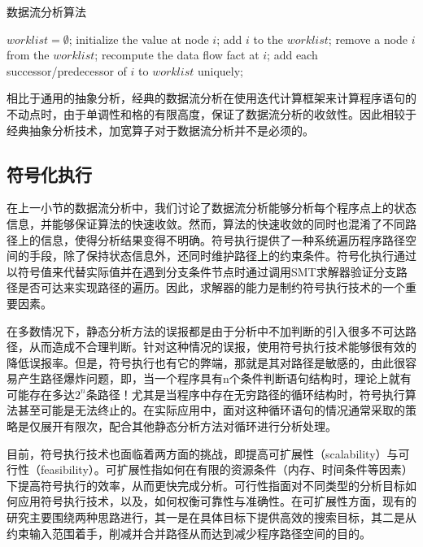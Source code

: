  \begin{algorithm}[H]
 	\caption{数据流分析算法}
 	\label{alg:数据流分析算法}
 	\begin{algorithmic}[1]
 		
 		\State $ worklist = \emptyset $;
 		\State initialize the value at node $ i $;
 		\State add $ i $ to the $ worklist $;
 		\EndFor
 		\State remove a node $ i $ from the $ worklist $;
 		\State recompute the data flow fact at $ i $;
 		\State add each successor/predecessor of $ i $ to $ worklist $ uniquely;
 		\EndIf
 		\EndWhile
 		\EndProcedure
 		
 	\end{algorithmic}
 \end{algorithm}
 
 相比于通用的抽象分析，经典的数据流分析在使用迭代计算框架来计算程序语句的不动点时，由于单调性和格的有限高度，保证了数据流分析的收敛性。因此相较于经典抽象分析技术，加宽算子对于数据流分析并不是必须的。
 
 \subsection{符号化执行}
 
 在上一小节的数据流分析中，我们讨论了数据流分析能够分析每个程序点上的状态信息，并能够保证算法的快速收敛。然而，算法的快速收敛的同时也混淆了不同路径上的信息，使得分析结果变得不明确。符号执行\cite{clarke1976system, king1976symbolic}提供了一种系统遍历程序路径空间的手段，除了保持状态信息外，还同时维护路径上的约束条件。符号化执行通过以符号值来代替实际值并在遇到分支条件节点时通过调用SMT求解器\cite{de2008z3}验证分支路径是否可达来实现路径的遍历。因此，求解器的能力是制约符号执行技术的一个重要因素。
 
 在多数情况下，静态分析方法的误报都是由于分析中不加判断的引入很多不可达路径，从而造成不合理判断。针对这种情况的误报，使用符号执行技术能够很有效的降低误报率。但是，符号执行也有它的弊端，那就是其对路径是敏感的，由此很容易产生路径爆炸问题，即，当一个程序具有n个条件判断语句结构时，理论上就有可能存在多达$ 2^n $条路径！尤其是当程序中存在无穷路径的循环结构时，符号执行算法甚至可能是无法终止的。在实际应用中，面对这种循环语句的情况通常采取的策略是仅展开有限次，配合其他静态分析方法对循环进行分析处理。
 
 目前，符号执行技术也面临着两方面的挑战，即提高可扩展性（scalability）与可行性（feasibility）。可扩展性指如何在有限的资源条件（内存、时间条件等因素）下提高符号执行的效率，从而更快完成分析。可行性指面对不同类型的分析目标如何应用符号执行技术，以及，如何权衡可靠性与准确性。在可扩展性方面，现有的研究主要围绕两种思路进行，其一是在具体目标下提供高效的搜索目标，其二是从约束输入范围着手，削减并合并路径从而达到减少程序路径空间的目的。
 

